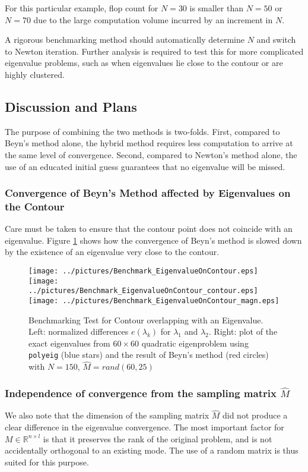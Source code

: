 \documentclass[11pt,letterpaper]{article}
\begin{document}
For this particular example, flop count for $N=30$ is smaller than $N=50$ or $N=70$ due to the large computation volume incurred by an increment in $N$. 




A rigorous benchmarking method should automatically determine $N$ and switch to Newton iteration. Further analysis is required to test this for more complicated eigenvalue problems, such as when eigenvalues lie close to the contour or are highly clustered.
\pagebreak
\subsection{Discussion and Plans}
The purpose of combining the two methods is two-folds. First, compared to Beyn's method alone, the hybrid method requires less computation to arrive at the same level of convergence. Second, compared to Newton's method alone, the use of an educated initial guess guarantees that no eigenvalue will be missed.
\subsubsection{Convergence of Beyn's Method affected by Eigenvalues on the Contour}
Care must be taken to ensure that the contour point does not coincide with an eigenvalue. Figure \ref{fig:overlap} shows how the convergence of Beyn's method is slowed down by the existence of an eigenvalue very close to the contour.
\begin{figure}\label{fig:overlap}
\begin{center}
\texttt{[image: ../pictures/Benchmark\_EigenvalueOnContour.eps]}\\
\texttt{[image: ../pictures/Benchmark\_EigenvalueOnContour\_contour.eps]}
\texttt{[image: ../pictures/Benchmark\_EigenvalueOnContour\_magn.eps]}
\end{center}
\caption{Benchmarking Test for Contour overlapping with an Eigenvalue. \textnormal{Left: normalized differences $e(\lambda_k)$ for $\lambda_1$ and $\lambda_2$. Right: plot of the exact eigenvalues from $60 \times 60$ quadratic eigenproblem using {\tt polyeig} (blue stars) and the result of Beyn's method (red circles) with $N=150$, $\hat{M}=rand(60,25)$}}
\end{figure}

\subsubsection{Independence of convergence from the sampling matrix $\hat{M}$}
We also note that the dimension of the sampling matrix $\hat{M}$ did not produce a clear difference in the eigenvalue convergence. The most important factor for $M\in \mathbb{R}^{n\times l}$ is that it preserves the rank of the original problem, and is not accidentally orthogonal to an existing mode. The use of a random matrix is thus suited for this purpose.
\end{document}

